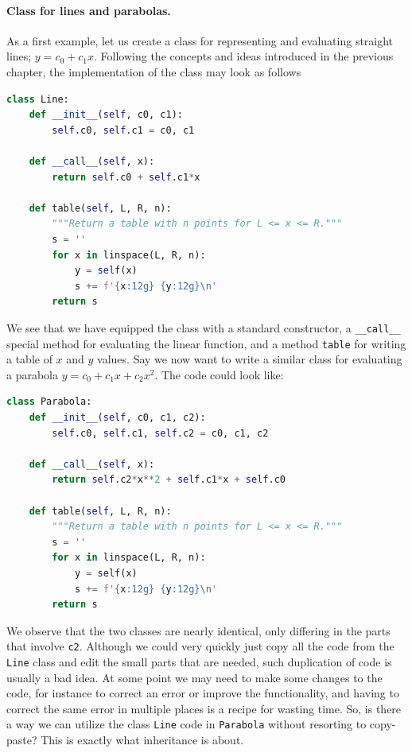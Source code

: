 \documentclass[graybox,envcountchap,sectrefs,final]{svmonodo}
\begin{document}
\paragraph{Class for lines and parabolas.}
As a first example, let us create a class for representing and evaluating straight lines;
$y=c_0 + c_1x$. Following the concepts and ideas introduced in the previous chapter, the
implementation of the class may look as follows
\begin{lstlisting}[language=Python,style=blue1]
class Line:
    def __init__(self, c0, c1):
        self.c0, self.c1 = c0, c1

    def __call__(self, x):
        return self.c0 + self.c1*x

    def table(self, L, R, n):
        """Return a table with n points for L <= x <= R."""
        s = ''
        for x in linspace(L, R, n):
            y = self(x)
            s += f'{x:12g} {y:12g}\n'
        return s
\end{lstlisting}
We see that we have equipped the class with a standard constructor, a \Verb!__call__! special method
for evaluating the linear function, and a method \texttt{table} for writing a table of $x$ and $y$ values.
Say we now want to write a similar class for evaluating a parabola $y=c_0 + c_1x + c_2x^2$.
The code could look like:
\begin{lstlisting}[language=Python,style=blue1]
class Parabola:
    def __init__(self, c0, c1, c2):
        self.c0, self.c1, self.c2 = c0, c1, c2

    def __call__(self, x):
        return self.c2*x**2 + self.c1*x + self.c0

    def table(self, L, R, n):
        """Return a table with n points for L <= x <= R."""
        s = ''
        for x in linspace(L, R, n):
            y = self(x)
            s += f'{x:12g} {y:12g}\n'
        return s
\end{lstlisting}
We observe that the two classes are nearly identical, only differing in the parts
that involve \texttt{c2}. Although we could very quickly just copy all the code from the \texttt{Line} class
and edit the small parts that are needed, such duplication of code is usually a bad idea.
At some point we may need to make some changes to the code, for instance to correct an error or
improve the functionality, and having to correct the same error in multiple places is a recipe for
wasting time. So, is there a way we can utilize the class \texttt{Line} code in \texttt{Parabola} without
resorting to copy-paste? This is exactly what inheritance is about.
\end{document}
